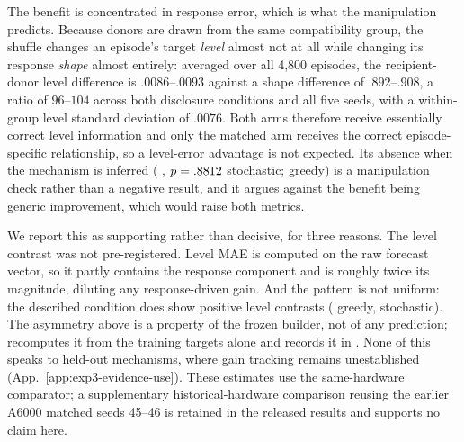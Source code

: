 \begin{table}[htbp]
\centering\footnotesize
\setlength{\tabcolsep}{3pt}

\caption{\textbf{The matched advantage does not appear in level error.}
Shuffled-minus-matched level MAE, same runs and estimators as
Table~\ref{tab:exp3-shuffled-control}. The inferred-mechanism cells show no
matched benefit. This contrast was not pre-registered and is descriptive.}
\label{tab:exp3-shuffled-control-level}
\end{table}

The benefit is concentrated in response error, which is what the manipulation
predicts. Because donors are drawn from the same compatibility group, the
shuffle changes an episode's target \emph{level} almost not at all while
changing its response \emph{shape} almost entirely: averaged over all 4,800
episodes, the recipient-donor level difference is $.0086$--$.0093$ against a
shape difference of $.892$--$.908$, a ratio of $96$--$104$ across both
disclosure conditions and all five seeds, with a within-group level standard
deviation of $.0076$. Both arms therefore receive essentially correct level
information and only the matched arm receives the correct episode-specific
relationship, so a level-error advantage is not expected. Its absence when the
mechanism is inferred (\eShufUndiscStochLevelEst{} \eShufUndiscStochLevelCi{},
$p=.8812{}$ stochastic; \eShufUndiscGreedyLevelEst{}
\eShufUndiscGreedyLevelCi{} greedy) is a manipulation check rather than a
negative result, and it argues against the benefit being generic improvement,
which would raise both metrics.

We report this as supporting rather than decisive, for three reasons. The
level contrast was not pre-registered. Level MAE is computed on the raw
forecast vector, so it partly contains the response component and is roughly
twice its magnitude, diluting any response-driven gain. And the pattern is not
uniform: the described condition does show positive level contrasts
(\eShufDiscGreedyLevelEst{} greedy, \eShufDiscStochLevelEst{} stochastic). The
asymmetry above is a property of the frozen builder, not of any prediction;
 recomputes it from the training targets
alone and records it in . None of this speaks
to held-out mechanisms, where gain tracking remains unestablished
(App.~\ref{app:exp3-evidence-use}). These estimates use the same-hardware
comparator; a supplementary historical-hardware comparison reusing the earlier
A6000 matched seeds 45--46 is retained in the released results and supports no
claim here.


